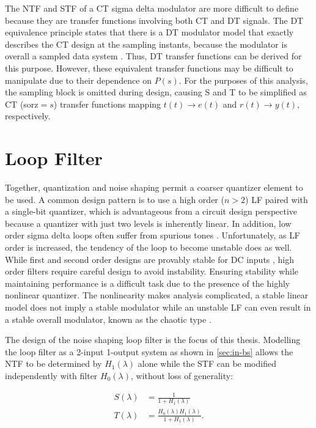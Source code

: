 The \gls{NTF} and \gls{STF} of a \gls{CT} sigma delta modulator are more difficult to define because they are transfer functions involving both \gls{CT} and \gls{DT} signals. The \gls{DT} equivalence principle states that there is a \gls{DT} modulator model that exactly describes the \gls{CT} design at the sampling instants, because the modulator is overall a sampled data system \cite[Sec. 3.2]{Ortmanns2005}. Thus, \gls{DT} transfer functions can be derived for this purpose. However, these equivalent transfer functions may be difficult to manipulate due to their dependence on $P(s)$. For the purposes of this analysis, the sampling block is omitted during design, causing \gls{S} and \gls{T} to be simplified as \gls{CT} (\gls{sorz}$=s$) transfer functions mapping $t(t) \rightarrow e(t)$ and $r(t) \rightarrow y(t)$, respectively.

\section{Loop Filter}
\label{sec:in-lf}

Together, quantization and noise shaping permit a coarser quantizer element to be used. A common design pattern is to use a high order ($n>2$)  \gls{LF} paired with a single-bit quantizer, which is advantageous from a circuit design perspective because a quantizer with just two levels is inherently linear. In addition, low order sigma delta loops often suffer from spurious tones \cite[Sec. 2.6.1]{Schreier1997}. Unfortunately, as \gls{LF} order is increased, the tendency of the loop to become unstable does as well. While first and second order designs are provably stable for DC inputs \cite{Hein1993}, high order filters require careful design to avoid instability. Ensuring stability while maintaining performance is a difficult task due to the presence of the highly nonlinear quantizer. The nonlinearity makes analysis complicated, a stable linear model does not imply a stable modulator while an unstable \gls{LF} can even result in a stable overall modulator, known as the chaotic type \cite{Risbo1994}.

The design of the noise shaping loop filter is the focus of this thesis. Modelling the loop filter as a 2-input 1-output system as shown in \autoref{sec:in-bs} allows the \gls{NTF} to be determined by $H_1(\lambda)$ alone while the \gls{STF} can be modified independently with filter $H_0(\lambda)$, without loss of generality:

\begin{align}
	S(\lambda) &= \frac{1}{1 + H_1(\lambda)} \label{eq:s} \\
	T(\lambda) &= \frac{H_0(\lambda)H_1(\lambda)}{1 + H_1(\lambda)}. \label{eq:t}
\end{align}

